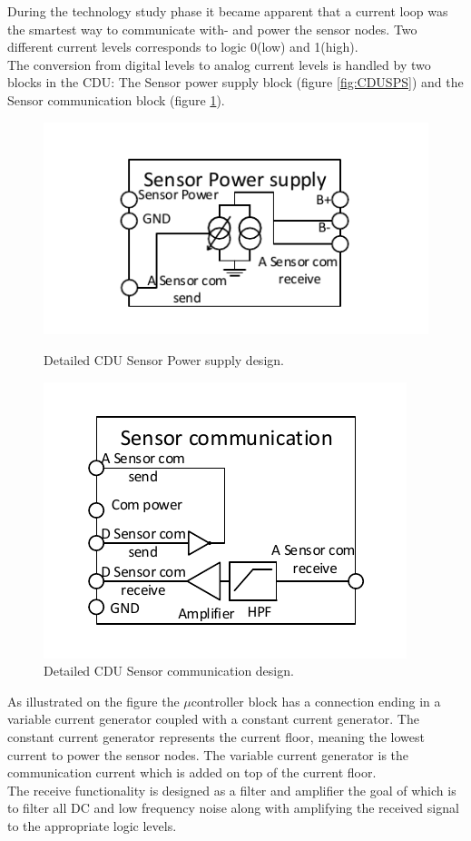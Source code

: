 During the technology study phase it became apparent that a current loop was the smartest way to communicate with- and power the sensor nodes. Two different current levels corresponds to logic 0(low) and 1(high).\\
The conversion from digital levels to analog current levels is handled by two blocks in the CDU: The Sensor power supply block (figure \ref{fig:CDUSPS}) and the Sensor communication block (figure \ref{fig:CDUSC}).
\begin{figure}[H]
	\begin{minipage}[b]{0.45\linewidth}
	\centering
	\includegraphics[scale=1]{billeder/11ProjectDescription/CDUSPS}
	\caption{Detailed CDU Sensor Power supply design.}
	\label{fig:CDUSPS}
	\end{minipage}
	\hspace{0.5cm}
	\begin{minipage}[b]{0.45\linewidth}
	\centering
	\includegraphics[scale=1]{billeder/11ProjectDescription/CDUSC}
	\caption{Detailed CDU Sensor communication design.}
	\label{fig:CDUSC}
	\end{minipage}
\end{figure}
As illustrated on the figure the $\mu$controller block has a connection ending in a variable current generator coupled with a constant current generator. The constant current generator represents the current floor, meaning the lowest current to power the sensor nodes. The variable current generator is the communication current which is added on top of the current floor.\\
The receive functionality is designed as a filter and amplifier the goal of which is to filter all DC and low frequency noise along with amplifying the received signal to the appropriate logic levels.

